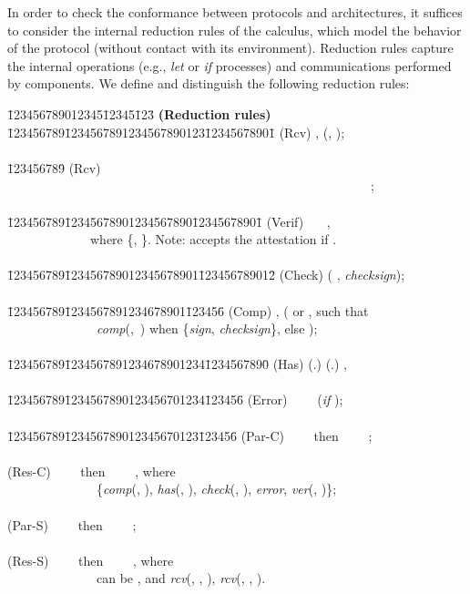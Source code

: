 \documentclass{llncs}
\begin{document}
In order to check the conformance between protocols and architectures, it suffices to consider  
the internal reduction rules of the calculus, which model the behavior of the protocol 
(without contact with its environment). Reduction rules capture the internal operations 
(e.g., \textit{let} or \textit{if} processes) and communications performed by components. We define 
and distinguish the following reduction rules:  
\small 
\begin{tabbing}
    \=123456789012345\=12345\=123\= \kill
    \> \textbf{(Reduction rules)}\\ 
    \=123456789\=1234567891234567890123\=12345678901\= \kill
    \> (Rcv) \> \small    \>  \>   ,   (, );\\\\
    \=123456789\= \kill
    \> (Rcv) \>   \ \ \  \\ 
    \>\ \ \ \ \ \ \ \ \ \ \ \ \ \ \ \ \ \ \ \ \ \ \ \ \ \ \ \ \ \ \ \ \ \ \ \ \ \ \ \ \ \ \ \ \ \ \ \ \ \ \ \ \ \ \ \ \   ;\\\\
    \=123456789\=12345678901234567890\=12345678901\= \kill
    \> (Verif) \> \ \ \  ,\\ 
    \>\ \ \ \ \ \ \ \ \ \ \ \ \ where \{, \}. Note:  accepts the attestation if   .\\\\
    \=123456789\=123456789012345678901\=123456789012\= \kill 
    \>(Check) \>  \>  \>  (  ,   \textit{checksign});\\\\  
    \=123456789\=1234567891234678901\=123456\= \kill
    \>(Comp) \> \>  \> , (   or , such that\\ 
    \>\ \ \ \ \ \ \ \ \ \ \ \ \ \    \textit{comp}(,\   ) when   \{\textit{sign}, \textit{checksign}\}, else   );\\\\  
    \=123456789\=1234567891234678901234\=1234567890\= \kill
    \> (Has) \> (.) \>  \> (.) ,\\\\
    \=123456789\=1234567890123456701234\=123456\= \kill
    \>(Error) \>  \>  \> \ \ \ \ (\textit{if}   );\\\\
   \=123456789\=123456789012345670123\=123456\= \kill
    \>(Par-C) \> \ \ \ \  then  \ \ \ \ ;\\\\ 
    \>(Res-C) \> \ \ \ \  then  \ \ \ \  , where\\
    \>\ \ \ \ \ \ \ \ \ \ \ \  \ \   \{\textit{comp}(, ), \textit{has}(, ), \textit{check}(, ), \textit{error}, \textit{ver}(, )\};\\\\ 
    \>(Par-S) \> \ \ \ \  then    \ \ \ \   ;\\\\ 
    \>(Res-S) \> \ \ \ \  then  \ \ \ \ , where\\
    \>\ \ \ \ \ \ \ \ \ \ \ \ \ \  can be , and \textit{rcv}(, , ), \textit{rcv}(, , ).
\end{tabbing}
\normalsize
\end{document}

